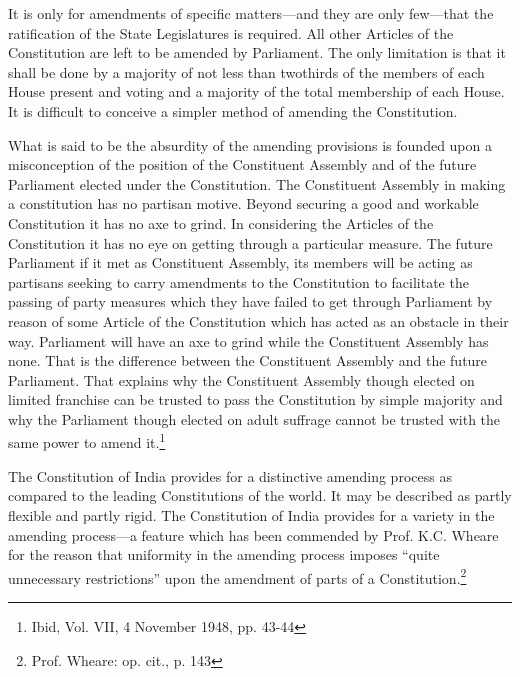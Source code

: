 \begin{multicols}{2}
\noi
 It is only for amendments of specific matters—and they are only few—that the ratification of
the State Legislatures is required. All other Articles of the Constitution are left to be amended
by Parliament. The only limitation is that it shall be done by a majority of not less than twothirds of the members of each House present and voting and a majority of the total membership
of each House. It is difficult to conceive a simpler method of amending the Constitution.

\noi
What is said to be the absurdity of the amending provisions is founded upon a misconception
of the position of the Constituent Assembly and of the future Parliament elected under the
Constitution. The Constituent Assembly in making a constitution has no partisan motive.
Beyond securing a good and workable Constitution it has no axe to grind. In considering the
Articles of the Constitution it has no eye on getting through a particular measure. The future Parliament if it met as Constituent Assembly, its members will be acting as partisans seeking
to carry amendments to the Constitution to facilitate the passing of party measures which they
have failed to get through Parliament by reason of some Article of the Constitution which has
acted as an obstacle in their way. Parliament will have an axe to grind while the Constituent
Assembly has none. That is the difference between the Constituent Assembly and the future
Parliament. That explains why the Constituent Assembly though elected on limited franchise
can be trusted to pass the Constitution by simple majority and why the Parliament though
elected on adult suffrage cannot be trusted with the same power to amend it.\footnote{Ibid, Vol. VII, 4 November 1948, pp. 43-44}


\noi
The Constitution of India provides for a distinctive amending process as compared to the
leading Constitutions of the world. It may be described as partly flexible and partly rigid. The
Constitution of India provides for a variety in the amending process—a feature which has
been commended by Prof. K.C. Wheare for the reason that uniformity in the amending process
imposes “quite unnecessary restrictions” upon the amendment of parts of a Constitution.\footnote{Prof. Wheare: op. cit., p. 143}


\end{multicols}
